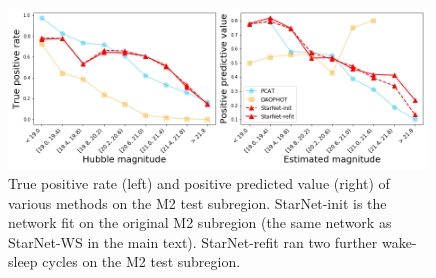 \begin{figure}[ht]
    \centering
    \includegraphics[width=0.99\textwidth]{figures/m2_test/summary_statistics_m2.png}
    \caption{True positive rate (left) and positive predicted value (right) of various methods on the M2 test subregion. 
    StarNet-init is the network fit on the original M2 subregion (the same network as StarNet-WS in the main text). 
StarNet-refit ran two further wake-sleep cycles on the M2 test subregion. 
    }
    \label{fig:summary_stats_m2test}
\end{figure}
